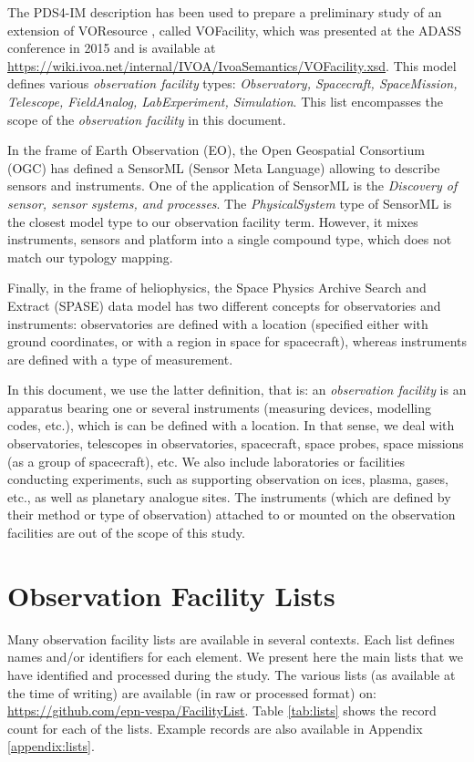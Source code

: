 \documentclass[11pt,a4paper]{ivoa}
\begin{document}
The PDS4-IM description has been used to prepare a preliminary study of
an extension of VOResource \citep{2018ivoa.spec.0625P}, called VOFacility, 
which was presented at the ADASS conference in 2015 \citep{Louys:2015to} 
and is available at \url{https://wiki.ivoa.net/internal/IVOA/IvoaSemantics/VOFacility.xsd}. 
This model defines various \emph{observation facility} types: 
\emph{Observatory, Spacecraft, SpaceMission, Telescope, FieldAnalog,
LabExperiment, Simulation}. This list encompasses the scope of the 
\emph{observation facility} in this document.

In the frame of Earth Observation (EO), the Open Geospatial Consortium
(OGC) has defined a SensorML (Sensor Meta Language) \citep{ogc-sensorml} 
allowing to describe sensors and instruments. One of the application of 
SensorML is the \emph{Discovery of sensor, sensor systems, and
processes}. 
The \emph{PhysicalSystem} type of SensorML is the closest model type to
our observation facility term.  However, it mixes instruments, sensors 
and platform into a single compound type, which does not match our 
typology mapping. 

Finally, in the frame of heliophysics, the Space Physics Archive Search
and Extract (SPASE) data model \citep{Roberts:2018bi} has two different
concepts for observatories and instruments: observatories are defined 
with a location (specified either with ground coordinates, or with a 
region in space for spacecraft), whereas instruments are defined with 
a type of measurement. 

In this document, we use the latter definition, that is: an 
\emph{observation facility} is an apparatus bearing one or several 
instruments (measuring devices, modelling codes, etc.), which is 
can be defined with a location. In that sense, we deal with observatories, 
telescopes in observatories, spacecraft, space probes, space missions 
(as a group of spacecraft), etc. We also include laboratories or 
facilities conducting  experiments, such as supporting observation on 
ices, plasma, gases, etc., as well as planetary analogue sites. The 
instruments (which are defined by their method or type of observation) 
attached to or mounted on the observation facilities are out of the scope 
of this study.


\section{Observation Facility Lists}
Many observation facility lists are available in several contexts. Each list
defines names and/or identifiers for each element. We present here the main 
lists that we have identified and processed during the study. The various 
lists (as available at the time of writing) are available (in raw or 
processed format) on: \url{https://github.com/epn-vespa/FacilityList}.
Table \ref{tab:lists} shows the record count for each of the lists. 
Example records are also available in Appendix \ref{appendix:lists}. 
\end{document}
